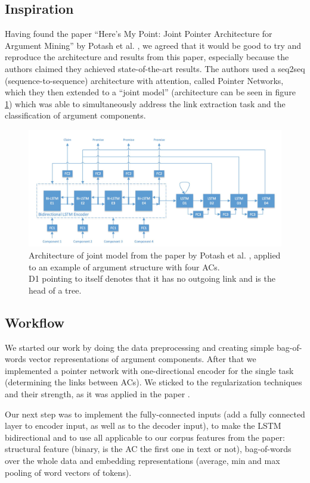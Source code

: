 \documentclass[onecolumn]{article}
\begin{document}
\subsection{Inspiration}
Having found the paper ``Here's My Point: Joint Pointer Architecture for Argument Mining'' by Potash et al. \cite{potash2017here}, we agreed that it
would be good to try and reproduce the architecture and results from this paper, especially because the authors claimed they achieved
state-of-the-art results. The authors used a seq2seq (sequence-to-sequence) architecture with attention, called
Pointer Networks, which they then extended to a ``joint model'' (architecture can be seen in figure \ref{fig:joint}) which was able to simultaneously address the link extraction task and the classification of argument components. 

\begin{figure}[h]
    \centering
    \includegraphics[width=0.8\linewidth]{fig/joint.png}
    \caption{Architecture of joint model from the paper by Potash et al. \cite{potash2017here}, applied to an example of argument structure with four ACs.
            \\D1 pointing to itself denotes that it has no outgoing link and is the head of a tree.}
    \label{fig:joint}
        \end{figure}

\subsection{Workflow}
We started our work by doing the data preprocessing and creating simple bag-of-words vector representations of argument components. 
After that we implemented a pointer network with one-directional encoder for the single task (determining the links between ACs).
We sticked to the regularization techniques and their strength, as it was applied in the paper \cite{potash2017here}. 

Our next step was to implement the fully-connected inputs (add a fully connected layer to encoder input,
as well as to the decoder input), to make the LSTM bidirectional and to use all applicable to our corpus features from the paper: structural feature 
(binary, is the AC the first one in text or not), bag-of-words over the whole data and embedding representations (average, min and max pooling
of word vectors of tokens). 
\end{document}
